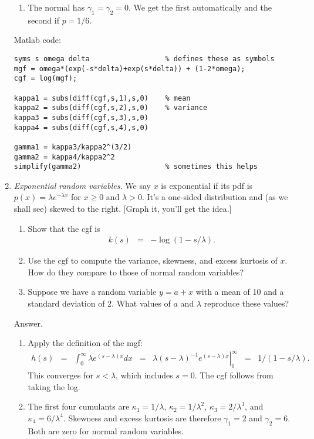 \documentclass[11pt]{article}
\begin{document}
\begin{enumerate}
\begin{enumerate}
\item The normal has $\gamma_1 = \gamma_2 = 0$.
We get the first automatically and the second if $p = 1/6$.
\end{enumerate}
Matlab code:
\begin{verbatim}
syms s omega delta                  % defines these as symbols
mgf = omega*(exp(-s*delta)+exp(s*delta)) + (1-2*omega);
cgf = log(mgf);

kappa1 = subs(diff(cgf,s,1),s,0)    % mean
kappa2 = subs(diff(cgf,s,2),s,0)    % variance
kappa3 = subs(diff(cgf,s,3),s,0)
kappa4 = subs(diff(cgf,s,4),s,0)

gamma1 = kappa3/kappa2^(3/2)
gamma2 = kappa4/kappa2^2
simplify(gamma2)                    % sometimes this helps
\end{verbatim}


\item {\it Exponential random variables.\/}
We say $x$ is exponential if its pdf is
$ %
    p(x) = \lambda e^{-\lambda x}
$ %
for $x \geq 0$ and $\lambda > 0$.
It's a one-sided distribution and (as we shall see) skewed to the right.
[Graph it, you'll get the idea.]
%
\begin{enumerate}
\item Show that the cgf is
\begin{eqnarray*}
    k(s)  &=& - \log \left( 1 - s/\lambda \right) .
\end{eqnarray*}
\item Use the cgf to compute the variance, skewness, and excess kurtosis
of $x$.  How do they compare to those of normal random variables?
\item Suppose we have a random variable $ y = a + x$
with  a mean of 10 and a standard deviation of 2.
What values of $a$ and $\lambda$ reproduce these values?
\end{enumerate}

Answer.
\begin{enumerate}
\item Apply the definition of the mgf:
\begin{eqnarray*}
    h(s) &=& \int_{0}^{\infty} \lambda e^{(s-\lambda)x} dx
            \;\;=\;\; \left. \lambda (s-\lambda)^{-1} e^{(s-\lambda)x} \right|_0^\infty
            \;\;=\;\; 1/(1-s/\lambda) .
\end{eqnarray*}
This converges for $s<\lambda$, which includes $s=0$.
The cgf follows from taking the log.
\item The first four cumulants are
$\kappa_1 = 1/\lambda$,
$\kappa_2 = 1/\lambda^2$,
$\kappa_3 = 2/\lambda^3$,
and $\kappa_4 = 6/\lambda^4$.
Skewness and excess kurtosis are therefore
$\gamma_1 = 2$ and $\gamma_2 = 6$.
Both are zero for normal random variables.


\end{enumerate}
\end{enumerate}
\end{document}
